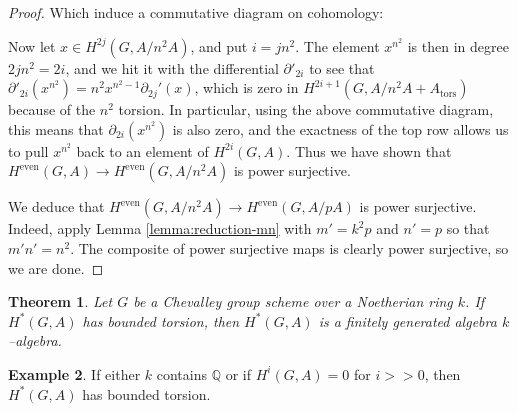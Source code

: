 \documentclass{article}
\theoremstyle{plain}
\newtheorem{Th}{Theorem}[section]
\theoremstyle{definition}
\newtheorem{Ex}[Th]{Example}
\DeclareMathOperator{\even}{even}
\DeclareMathOperator{\tors}{tors}
\begin{document}
\begin{proof}
Which induce a commutative diagram on cohomology:
\begin{center}
\end{center}
Now let $x\in H^{2j}(G, A/n^2A)$, and put $i=jn^2$. The element $x^{n^2}$ is then in degree $2jn^2=2i$, and we hit it with the differential $\partial'_{2i}$ to see that $\partial'_{2i}(x^{n^2})=n^2x^{n^2-1}\partial_{2j}'(x)$, which is zero in $H^{2i+1}(G, A/n^2A + A_{\tors})$ because of the $n^2$ torsion. In particular, using the above commutative diagram, this means that $\partial_{2i}(x^{n^2})$ is also zero, and the exactness of the top row allows us to pull $x^{n^2}$ back to an element of $H^{2i}(G, A)$. Thus we have shown that $H^{\even}(G, A)\to H^{\even}(G, A/n^2A)$ is power surjective.

We deduce that $H^{\even}(G, A/n^2A) \to H^{\even}(G, A/pA)$ is power surjective. Indeed,  apply  Lemma \ref{lemma:reduction-mn} with $m'=k^2p$ and $n'=p$ so that $m'n'=n^2$. The composite of power surjective maps is clearly power surjective, so we are done.
\end{proof}



\begin{Th}\label{torsion}
    Let $G$ be a Chevalley group scheme over a Noetherian ring $k$. If $H^*(G, A)$ has bounded torsion, then $H^*(G, A)$ is a finitely generated algebra $k$--algebra.
\end{Th}

\begin{Ex}
    If either $k$ contains $\mathbb{Q}$ or if $H^i(G, A)=0$ for $i>>0$, then $H^*(G, A)$ has bounded torsion.
\end{Ex}
\end{document}

